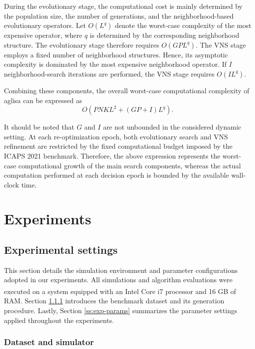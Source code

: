 \documentclass[pdflatex]{sn-jnl}
\begin{document}
During the evolutionary stage, the computational cost is mainly determined by the population size, the number of generations, and the neighborhood-based evolutionary operators. Let $O(L^q)$ denote the worst-case complexity of the most expensive operator, where $q$ is determined by the corresponding neighborhood structure. The evolutionary stage therefore requires
$O(GPL^q)$.
The VNS stage employs a fixed number of neighborhood structures. Hence, its asymptotic complexity is dominated by the most expensive neighborhood operator. If $I$ neighborhood-search iterations are performed, the VNS stage 
requires $O(IL^q)$.

Combining these components, the overall worst-case computational complexity of \gls{aglisa} can be expressed as
\[
O\left(PNKL^2 + (GP+I)L^q\right).
\]

It should be noted that $G$ and $I$ are not unbounded in the considered dynamic setting. At each re-optimization epoch, both evolutionary search and VNS refinement are restricted by the fixed computational budget imposed by the ICAPS 2021 benchmark. Therefore, the above expression represents the 
worst-case computational growth of the main search components, whereas the actual computation performed at each decision epoch is bounded by the available wall-clock time.

\section{Experiments}\label{sec:exp}
\subsection{Experimental settings}
This section details the simulation environment and parameter configurations adopted in our experiments. All simulations and algorithm evaluations were executed on a system equipped with an Intel \textsuperscript{\textregistered} Core\textsuperscript{\texttrademark} i7 processor and 16 GB of RAM. Section \ref{ss:exp-data} introduces the benchmark dataset and its generation procedure. Lastly, Section \ref{ss:exp-params} summarizes the parameter settings applied throughout the experiments.

\subsubsection{Dataset and simulator} \label{ss:exp-data}
\end{document}
